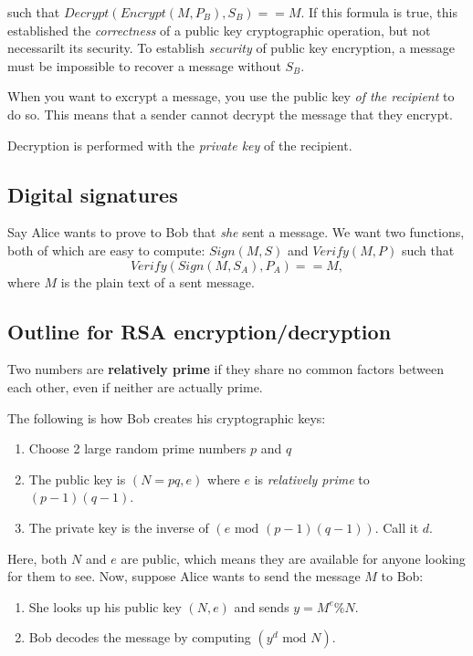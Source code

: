 \documentclass[titlepage, 12pt, leqno]{article}
\begin{document}
such that $Decrypt(Encrypt(M,P_{B}), S_{B}) == M$. If this formula is true, this
established the \textit{correctness} of a public key cryptographic operation, but
not necessarilt its security. To establish \textit{security} of public key
encryption, a message must be impossible to recover a message without $S_{B}$.

\begin{note}
    When you want to excrypt a message, you use the public key \textit{of the
    recipient} to do so. This means that a sender cannot decrypt the message that
    they encrypt.

    Decryption is performed with the \textit{private key} of the recipient.
\end{note}

\subsection{Digital signatures}

Say Alice wants to prove to Bob that \textit{she} sent a message. We want two 
functions, both of which are easy to compute: $Sign(M,S)$ and $Verify(M,P)$
such that
\[
Verify(Sign(M,S_{A}), P_{A}) == M,
\]
where $M$ is the plain text of a sent message. 

\subsection{Outline for RSA encryption/decryption}
\begin{definition}
    Two numbers are \textbf{relatively prime} if they share no common factors
    between each other, even if neither are actually prime.
\end{definition}

The following is how Bob creates his cryptographic keys:
\begin{enumerate}
    \item Choose 2 large random prime numbers $p$ and $q$
    \item The public key is $(N=pq,e)$ where $e$ is \textit{relatively prime} to
        $(p-1)(q-1)$.
    \item The private key is the inverse of $(e \text{ mod } (p-1)(q-1))$. Call it
        $d$.
\end{enumerate}
Here, both $N$ and $e$ are public, which means they are available for anyone
looking for them to see. Now, suppose Alice wants to send the message $M$ to Bob:

\begin{enumerate}
    \item She looks up his public key $(N,e)$ and sends $y = M^{e} \% N$.
    \item Bob decodes the message by computing $(y^{d} \text{ mod } N)$.
\end{enumerate}
\end{document}
